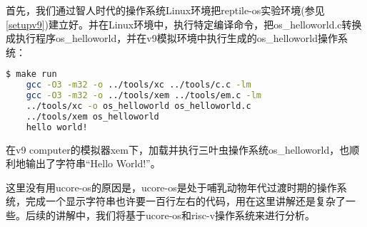 首先，我们通过智人时代的操作系统Linux环境把reptile-os实验环境(参见\ref{setupv9})建立好。并在Linux环境中，执行特定编译命令，把os\_helloworld.c转换成执行程序os\_helloworld，并在v9模拟环境中执行生成的os\_helloworld操作系统：
\begin{lstlisting}[language={bash}]
	$ make run
	gcc -O3 -m32 -o ../tools/xc ../tools/c.c -lm
	gcc -O3 -m32 -o ../tools/xem ../tools/em.c -lm
	../tools/xc -o os_helloworld os_helloworld.c
	../tools/xem os_helloworld
	hello world!
\end{lstlisting}

在v9 computer的模拟器xem下，加载并执行三叶虫操作系统os\_helloworld，也顺利地输出了字符串“Hello World!”。


\begin{note} 
这里没有用ucore-os的原因是，ucore-os是处于哺乳动物年代过渡时期的操作系统，完成一个显示字符串也许要一百行左右的代码，用在这里讲解还是复杂了一些。后续的讲解中，我们将基于ucore-os和risc-v操作系统来进行分析。
\end{note} 
